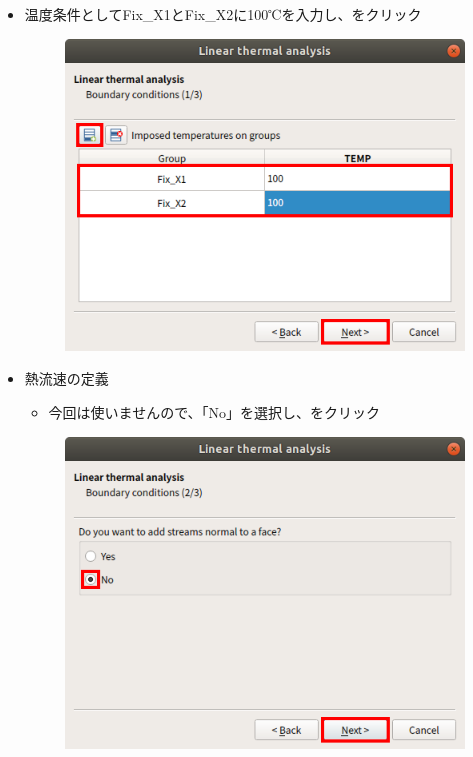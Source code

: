 \begin{itemize}
\begin{figure}[H]
	      \end{figure}
	      \clearpage
	\item 温度条件としてFix\_X1とFix\_X2に100℃を入力し、をクリック
	      \begin{figure}[H]
		      \centering
		      \includegraphics{fig/Assisant_thermal_005.png}
	      \end{figure}
	      \clearpage
	\item 熱流速の定義
	      \begin{itemize}
		      \item 今回は使いませんので、「No」を選択し、をクリック
	      \end{itemize}
	      \begin{figure}[H]
		      \centering
		      \includegraphics{fig/Assisant_thermal_006.png}

\end{figure}
\end{itemize}

